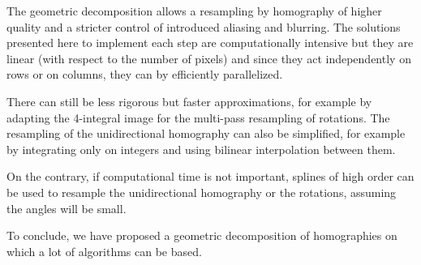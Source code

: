 









The geometric decomposition allows a resampling by homography of higher quality and a stricter control of introduced aliasing and blurring. The solutions presented here to implement each step are computationally intensive but they are linear (with respect to the number of pixels) and since they act independently on rows or on columns, they can by efficiently parallelized.

There can still be less rigorous but faster approximations, for example by adapting the 4-integral image for the multi-pass resampling of rotations. The resampling of the unidirectional homography can also be simplified, for example by integrating only on integers and using bilinear interpolation between them.

On the contrary, if computational time is not important, splines of high order can be used to resample the unidirectional homography or the rotations, assuming the angles will be small.

To conclude, we have proposed a geometric decomposition of homographies on which a lot of algorithms can be based.
